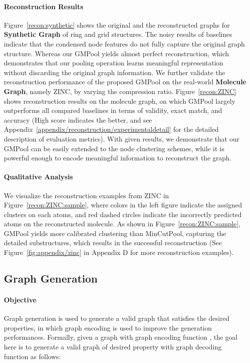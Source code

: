 \documentclass{article} \usepackage{iclr2021_conference,times}
\begin{document}
\vspace{-0.05in}
\paragraph{Reconstruction Results}
Figure~\ref{recon:synthetic} shows the original and the reconstructed graphs for \textbf{Synthetic Graph} of ring and grid structures. The noisy results of baselines indicate that the condensed node features do not fully capture the original graph structure. Whereas our GMPool yields almost perfect reconstruction, which demonstrates that our pooling operation learns meaningful representation without discarding the original graph information. We further validate the reconstruction performance of the proposed GMPool on the real-world \textbf{Molecule Graph}, namely ZINC, by varying the compression ratio. Figure~\ref{recon:ZINC} shows reconstruction results on the molecule graph, on which GMPool largely outperforms all compared baselines in terms of validity, exact match, and accuracy (High score indicates the better, and see Appendix~\ref{appendix/reconstruction/experimentaldetail} for the detailed description of evaluation metrics). With given results, we demonstrate that our GMPool can be easily extended to the node clustering schemes, while it is powerful enough to encode meaningful information to reconstruct the graph. 

\vspace{-0.05in}
\paragraph{Qualitative Analysis} 
We visualize the reconstruction examples from ZINC in Figure~\ref{recon:ZINC:sample}, where colors in the left figure indicate the assigned clusters on each atoms, and red dashed circles indicate the incorrectly predicted atoms on the reconstructed molecule. As shown in Figure~\ref{recon:ZINC:sample}, GMPool yields more calibrated clustering than MinCutPool, capturing the detailed substructures, which results in the successful reconstruction (See Figure~\ref{fig:appendix/zinc} in Appendix D for more reconstruction examples).

\subsection{Graph Generation \label{experiment/generation}}

\paragraph{Objective} Graph generation is used to generate a valid graph that satisfies the desired properties, in which graph encoding is used to improve the generation performances. Formally, given a graph  with graph encoding function , the goal here is to generate a valid graph  of desired property  with graph decoding function  as follows:
\end{document}
